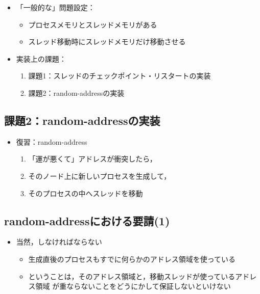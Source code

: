\documentclass[25pt,papersize,landscape]{jsarticle}
\begin{document}
\begin{itemize}
\item 「一般的な」問題設定：
  \begin{itemize}
  \item プロセスメモリとスレッドメモリがある
  \item スレッド移動時にスレッドメモリだけ移動させる
  \end{itemize}
\item 実装上の課題：
  \begin{enumerate}
  \item 課題1：スレッドのチェックポイント・リスタートの実装
  \item 課題2：random-addressの実装
  \end{enumerate}
\end{itemize}



\subsection{課題2：random-addressの実装}

\begin{itemize}
\item 復習：random-address
  \begin{enumerate}
  \item 「運が悪くて」アドレスが衝突したら，
  \item そのノード上に新しいプロセスを生成して，
  \item そのプロセスの中へスレッドを移動
  \end{enumerate}
\end{itemize}


\subsection{random-addressにおける要請(1)}

\begin{itemize}
\item 当然，しなければならない
  \begin{itemize}
  \item 生成直後のプロセスもすでに何らかのアドレス領域を使っている
  \item ということは，そのアドレス領域と，移動スレッドが使っているアドレス領域
    が重ならないことをどうにかして保証しないといけない
  \end{itemize}
\end{itemize}
\end{document}
